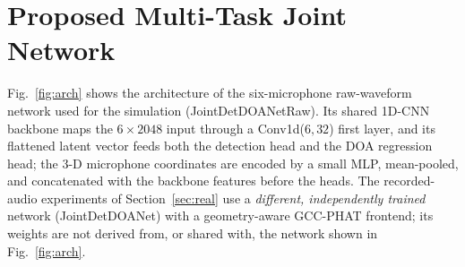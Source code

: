 \documentclass[5p,twocolumn]{elsarticle}
\begin{document}
\section{Proposed Multi-Task Joint Network}
\label{sec:method}
Fig.~\ref{fig:arch} shows the architecture of the six-microphone raw-waveform network used for the simulation (JointDetDOANetRaw). Its shared 1D-CNN backbone maps the $6\times2048$ input through a Conv1d($6,32$) first layer, and its flattened latent vector feeds both the detection head and the DOA regression head; the 3-D microphone coordinates are encoded by a small MLP, mean-pooled, and concatenated with the backbone features before the heads. The recorded-audio experiments of Section~\ref{sec:real} use a \emph{different, independently trained} network (JointDetDOANet) with a geometry-aware GCC-PHAT frontend; its weights are not derived from, or shared with, the network shown in Fig.~\ref{fig:arch}.
\end{document}
